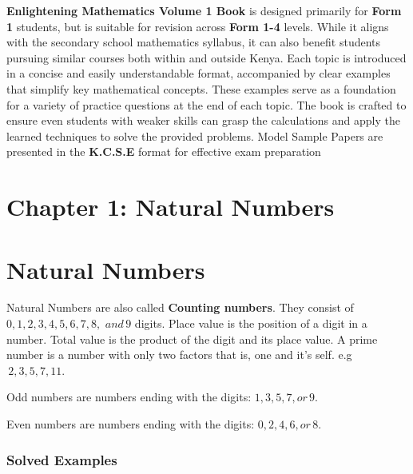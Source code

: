 \documentclass[
  a4paperpaper,
]{scrbook}
\begin{document}
\textbf{Enlightening Mathematics Volume 1 Book} is designed primarily
for \textbf{Form 1} students, but is suitable for revision across
\textbf{Form 1-4} levels. While it aligns with the secondary school
mathematics syllabus, it can also benefit students pursuing similar
courses both within and outside Kenya. Each topic is introduced in a
concise and easily understandable format, accompanied by clear examples
that simplify key mathematical concepts. These examples serve as a
foundation for a variety of practice questions at the end of each topic.
The book is crafted to ensure even students with weaker skills can grasp
the calculations and apply the learned techniques to solve the provided
problems. Model Sample Papers are presented in the \textbf{K.C.S.E}
format for effective exam preparation


\hypertarget{chapter-1-natural-numbers}{%
\chapter{Chapter 1: Natural Numbers}\label{chapter-1-natural-numbers}}


\hypertarget{natural-numbers}{%
\chapter*{Natural Numbers}\label{natural-numbers}}


Natural Numbers are also called \textbf{Counting numbers}. They consist
of \(0, 1, 2, 3, 4, 5, 6, 7, 8,\) \(and\, 9\) digits. Place value is the
position of a digit in a number. Total value is the product of the digit
and its place value. A prime number is a number with only two factors
that is, one and it's self. e.g \(\,2, 3, 5, 7, 11.\)

Odd numbers are numbers ending with the digits: \(1, 3, 5, 7, or \,9.\)

Even numbers are numbers ending with the digits: \(0, 2, 4, 6, or\, 8.\)

\hypertarget{solved-examples}{%
\subsection{Solved Examples}\label{solved-examples}}
\end{document}
